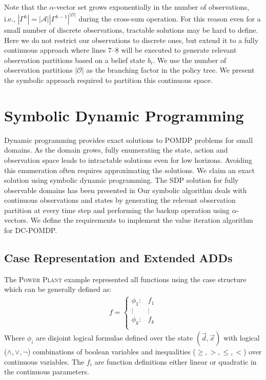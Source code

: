 \documentclass{article} %
\begin{document}
Note that the $\alpha$-vector set grows exponentially in the number of observations, i.e., $|\Gamma^{h}| = |\mathcal{A}||\Gamma^{h-1}|^{|\mathcal{O}|}$ during the cross-sum operation. For this reason even for a small number of discrete observations, tractable solutions may be hard to define. Here we do not restrict our observations to discrete ones, but extend it to a fully continuous approach where lines 7--8 will be executed to generate relevant observation partitions based on a belief state $b_i$. We use the number of  observation partitions $|\mathcal{O}|$ as the branching factor in the policy tree. We present the symbolic approach required to partition this continuous space. 

\section{Symbolic Dynamic Programming} 
Dynamic programming provides exact solutions to POMDP problems for small domains. As the domain grows, fully enumerating the state, action and observation space leads to intractable solutions even for low horizons. Avoiding this enumeration often requires approximating the solutions. We claim an exact solution using symbolic dynamic programming. The SDP solution for fully observable domains has been presented in \cite{sanner_uai11} %
Our symbolic algorithm deals with continuous observations and states by generating the relevant observation partition at every time step and performing the backup operation using $\alpha$-vectors. We define the requirements to implement the value iteration algorithm for DC-POMDP. 

\subsection{Case Representation and Extended ADDs}
The \textsc{Power Plant} example represented all functions using the case structure which can be generally defined as:
{\footnotesize 
\begin{align}
f = 
\begin{cases}
  \phi_1: & f_1 \\ 
 \vdots&\vdots\\ 
  \phi_k: & f_k \\ 
\end{cases} \nonumber
\end{align}
}
Where $\phi_i$ are disjoint logical formulae defined over the state $(\vec{d},\vec{x})$ with logical ($\land,\lor,\neg$) combinations of boolean variables and inequalities ($\geq,>,\leq,<$) over continuous variables.  
The $f_i$ are function definitions either linear or quadratic in the continuous parameters. 
\end{document}
